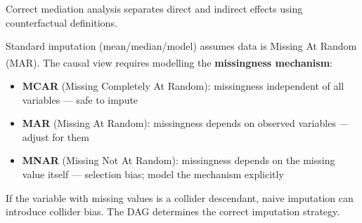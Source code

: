 \begin{tcbitemize}[ skin=sectionraster ]
    Correct mediation analysis separates direct and indirect effects using
    counterfactual definitions.

    \tcbitem[title={Missing Values: Causal View}, raster multicolumn=3]
    Standard imputation (mean/median/model) assumes data is Missing At
    Random (MAR). The causal view requires modelling the
    \textbf{missingness mechanism}:\textsuperscript{\cite[][Ch.~8]{nessCausalAI2025}}

    \begin{itemize}
        \item \textbf{MCAR} (Missing Completely At Random): missingness
              independent of all variables --- safe to impute
        \item \textbf{MAR} (Missing At Random): missingness depends on
              observed variables --- adjust for them
        \item \textbf{MNAR} (Missing Not At Random): missingness depends
              on the missing value itself --- selection bias; model the
              mechanism explicitly
    \end{itemize}

    If the variable with missing values is a collider descendant, naive
    imputation can introduce collider bias. The DAG determines the
    correct imputation strategy.

    \end{tcbitemize}


